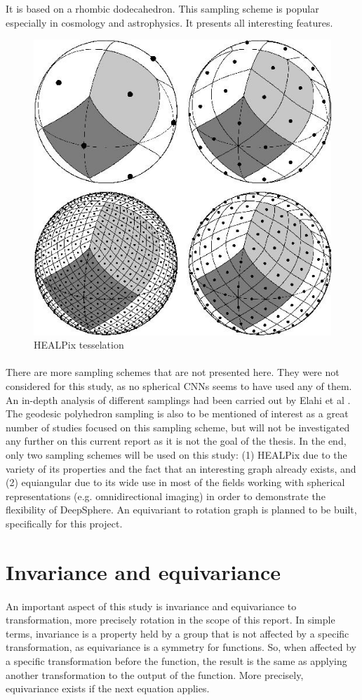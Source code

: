 \documentclass[11pt]{report}
\begin{document}
\begin{description}
            It is based on a rhombic dodecahedron. This sampling scheme is popular especially in cosmology and astrophysics. It presents all interesting features.
            \begin{figure}[h!t]
                \centering
                \includegraphics[width=0.3\linewidth]{gorski_f1.jpg}
                \caption{HEALPix tesselation}
                \label{fig:healpix}
            \end{figure}
        \end{description}
\paragraph*{}        
There are more sampling schemes that are not presented here. They were not considered for this study, as no spherical CNNs seems to have used any of them. An in-depth analysis of different samplings had been carried out by Elahi et al \cite{elahi_comparative_2016}. The geodesic polyhedron sampling is also to be mentioned of interest as a great number of studies focused on this sampling scheme, but will not be investigated any further on this current report as it is not the goal of the thesis.
In the end, only two sampling schemes will be used on this study: (1) HEALPix due to the variety of its properties and the fact that an interesting graph already exists, and (2) equiangular due to its wide use in most of the fields working with spherical representations (e.g. omnidirectional imaging) in order to demonstrate the flexibility of DeepSphere. An equivariant to rotation graph is planned to be built, specifically for this project.

         
\section{Invariance and equivariance}
\paragraph*{}
An important aspect of this study is invariance and equivariance to transformation, more precisely rotation in the scope of this report. In simple terms, invariance is a property held by a group that is not affected by a specific transformation, as equivariance is a symmetry for functions. So, when affected by a specific transformation before the function, the result is the same as applying another transformation to the output of the function.
More precisely, equivariance exists if the next equation applies.
\end{document}
